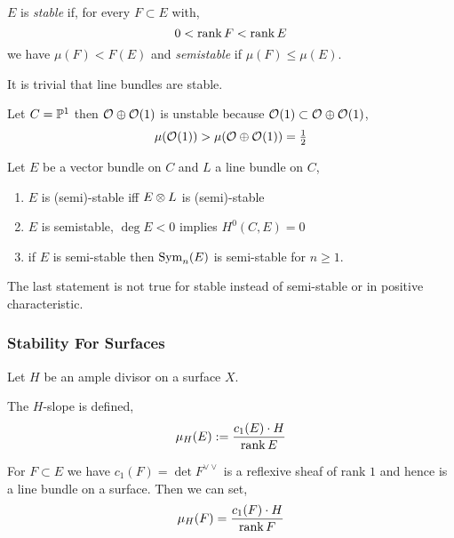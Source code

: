 \documentclass[12pt]{article}
\begin{document}
\begin{defn}
$E$ is \textit{stable} if, for every $F \subset E$ with,
\[ 0 < \rank{F} < \rank{E} \]
we have $\mu(F) < F(E)$ and \textit{semistable} if $\mu(F) \le \mu(E)$.
\end{defn}

\begin{rmk}
It is trivial that line bundles are stable. 
\end{rmk}

\begin{example}
Let $C = \P^1$ then $\struct{} \oplus \struct{}(1)$ is unstable because $\struct{}(1) \subset \struct{} \oplus \struct{}(1)$,
\[ \mu(\struct{}(1)) > \mu(\struct{} \oplus \struct{}(1)) = \tfrac{1}{2} \]
\end{example}

\begin{theorem}
Let $E$ be a vector bundle on $C$ and $L$ a line bundle on $C$,
\begin{enumerate}
\item $E$ is (semi)-stable iff $E \ot L$ is (semi)-stable

\item $E$ is semistable, $\deg{E} < 0$ implies $H^0(C, E) = 0$ 

\item if $E$ is semi-stable then $\Sym{n}{E}$ is semi-stable for $n \ge 1$. 
\end{enumerate}
\end{theorem}

\begin{rmk}
The last statement is not true for stable instead of semi-stable or in positive characteristic. 
\end{rmk}

\subsubsection{Stability For Surfaces}

Let $H$ be an ample divisor on a surface $X$.

\begin{defn}
The $H$-slope is defined,
\[ \mu_H(E) := \frac{c_1(E) \cdot H}{\rank{E}} \]
\end{defn}

\begin{defn}
For $F \subset E$ we have $c_1(F) = \det{F}^{\vee \vee}$ is a reflexive sheaf of rank $1$ and hence is a line bundle on a surface. Then we can set,
\[ \mu_H(F) = \frac{c_1(F) \cdot H}{\rank{F}} \]
\end{defn}
\end{document}
